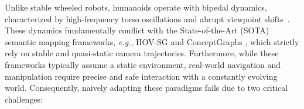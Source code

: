 \documentclass[conference]{IEEEtran}
\begin{document}

Unlike stable wheeled robots, humanoids operate with bipedal dynamics, characterized by high-frequency torso oscillations and abrupt viewpoint shifts~\cite{stasse2006real, kajita20013d}. These dynamics fundamentally conflict with the State-of-the-Art (SOTA) semantic mapping frameworks, \emph{e.g.}, HOV-SG \cite{Werby-RSS-24} and ConceptGraphs \cite{gu2024conceptgraphs}, which strictly rely on stable and quasi-static camera trajectories. Furthermore, while these frameworks typically assume a static environment, real-world navigation and manipulation require precise and safe interaction with a constantly evolving world. Consequently, naively adapting these paradigms fails due to two critical challenges:

    
\end{document}
